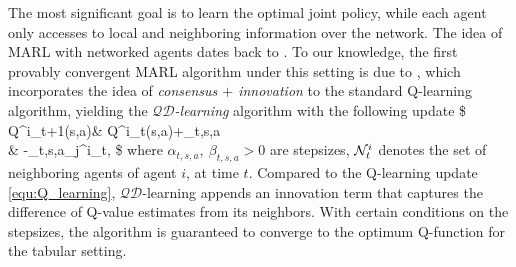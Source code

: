 \vspace{6pt}
\vspace{3pt}

The most significant goal is to learn the optimal joint policy, while each agent only accesses to  local and neighboring information over the network.  
The idea of MARL with networked agents dates back to \cite{varshavskaya2009efficient}. 
To our knowledge, 
 the first provably convergent MARL algorithm under this setting is  due to \cite{kar2013cal}, which incorporates  the idea of  \emph{consensus $+$ innovation} to the standard Q-learning algorithm, yielding the \emph{$\mathcal{QD}$-learning} algorithm with the following update
\$
Q^i_{t+1}(s,a)\leftarrow & Q^i_{t}(s,a)+\alpha_{t,s,a} \notag \\
& \qquad -\beta_{t,s,a}\sum_{j\in\cN^i_t}\big[Q^i_t(s,a)-Q^j_t(s,a)\big],
\$
where $\alpha_{t,s,a},~\beta_{t,s,a}>0$ are  stepsizes, $\mathcal{N}^i_t$ denotes the set of neighboring agents of agent $i$, at time $t$.  Compared to the Q-learning update \eqref{equ:Q_learning}, \emph{$\mathcal{QD}$}-learning appends an innovation term that captures the difference of Q-value estimates from its neighbors. With certain conditions on the stepsizes, the algorithm is guaranteed to converge to the optimum Q-function for the tabular setting.  

